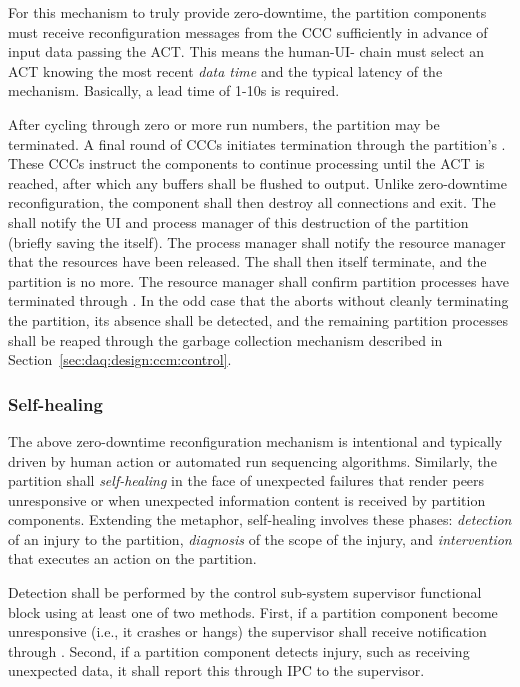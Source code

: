For this mechanism to truly provide zero-downtime, the partition components must receive reconfiguration messages from the CCC sufficiently in advance of input data passing the ACT.
This means the human-UI- chain must select an ACT knowing the most recent \textit{data time} and the typical latency of the mechanism. 
Basically, a lead time of 1-10s is required. 

After cycling through zero or more run numbers, the partition may be terminated. 
A final round of CCCs initiates termination through the partition's . 
These CCCs instruct the components to continue processing until the ACT is reached, after which any buffers shall be flushed to output. 
Unlike zero-downtime reconfiguration, the component shall then destroy all connections and exit. 
The  shall notify the UI and process manager of this destruction of the partition (briefly saving the  itself). 
The process manager shall notify the resource manager that the resources have been released. 
The  shall then itself terminate, and the partition is no more.
The resource manager shall confirm partition processes have terminated through . 
In the odd case that the  aborts without cleanly terminating the partition, its absence shall be detected, and the remaining partition processes shall be reaped  through the garbage collection mechanism described in Section~\ref{sec:daq:design:ccm:control}.

\subsubsection{Self-healing}
\label{sec:daq:self-healing}

The above zero-downtime reconfiguration mechanism is intentional and typically driven by human action or automated run sequencing algorithms. 
Similarly, the partition shall \textit{self-healing} in the face of unexpected failures that render peers unresponsive or when unexpected information content is received by partition components.  
Extending the metaphor, self-healing involves these phases: \textit{detection} of an injury to the partition, \textit{diagnosis} of the scope of the injury, and \textit{intervention} that executes an action on the partition.

Detection shall be performed by the  control sub-system supervisor functional block using at least one of two methods.
First, if a partition component become unresponsive (i.e., it crashes or hangs) the supervisor shall receive notification through  . 
Second, if a partition component detects injury, such as receiving unexpected data, it shall report this through IPC to the supervisor.

